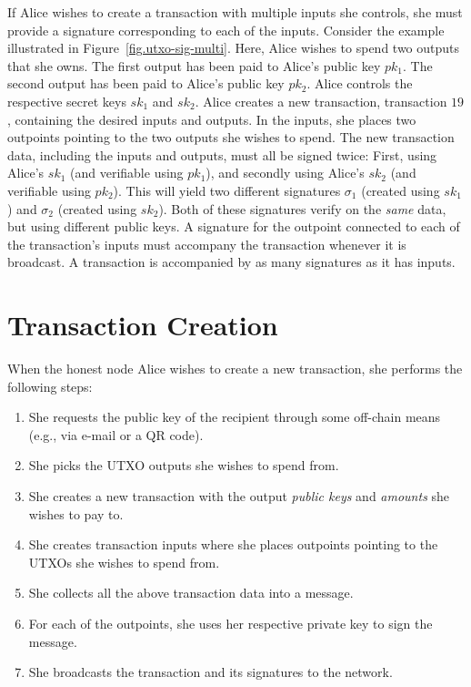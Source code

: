 If Alice wishes to create a transaction with multiple inputs she controls, she must
provide a signature corresponding to each of the inputs. Consider the example illustrated
in Figure~\ref{fig.utxo-sig-multi}. Here, Alice wishes to spend two outputs that she
owns. The first output has been paid to Alice's public key $pk_1$. The second output
has been paid to Alice's public key $pk_2$. Alice controls the respective secret keys
$sk_1$ and $sk_2$. Alice creates a new transaction, transaction $19$, containing the
desired inputs and outputs. In the inputs, she places two outpoints pointing to the
two outputs she wishes to spend. The new transaction data, including the inputs and outputs,
must all be signed twice: First, using Alice's $sk_1$ (and verifiable using $pk_1$),
and secondly using Alice's $sk_2$ (and verifiable using $pk_2$). This will yield two
different signatures $\sigma_1$ (created using $sk_1$) and $\sigma_2$ (created using
$sk_2$). Both of these signatures verify on the \emph{same} data, but using different
public keys. A signature for the outpoint connected to each of the transaction's inputs
must accompany the transaction whenever it is broadcast. A transaction is accompanied
by as many signatures as it has inputs.

\section{Transaction Creation}

When the honest node Alice wishes to create a new transaction, she performs the following steps:

\begin{enumerate}
  \item She requests the public key of the recipient through some off-chain means (e.g., via e-mail or a QR code).
  \item She picks the UTXO outputs she wishes to spend from.
  \item She creates a new transaction with the output \emph{public keys} and \emph{amounts} she wishes to pay to.
  \item She creates transaction inputs where she places outpoints pointing to the UTXOs she wishes to spend from.
  \item She collects all the above transaction data into a message.
  \item For each of the outpoints, she uses her respective private key to sign the message.
  \item She broadcasts the transaction and its signatures to the network.
\end{enumerate}

